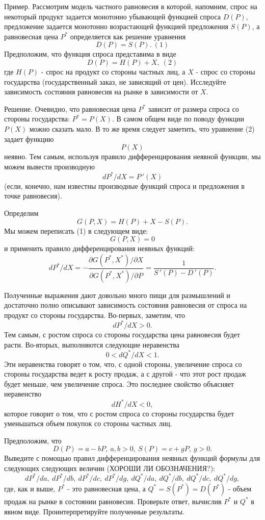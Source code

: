     Пример. Рассмотрим модель частного равновесия в которой,
    напомним, спрос на некоторый продукт задается монотонно
    убывающей функцией спроса $D(P)$, предложение задается монотонно
    возрастающей функцией предложения $S(P)$, а равновесная цена
    $P^{*}$  определяется как решение уравнения
    \[D(P)=S(P). \ (1)\]
    Предположим, что функция спроса представима в виде
    \[D(P)=H(P)+X, \   (2)\]
    где $H(P)$ - спрос на продукт со стороны частных лиц, а $X$ - спрос со
    стороны государства (государственный заказ, не зависящий от цен).
    Исследуйте зависимость состояния равновесия на рынке в зависимости
    от $X$.

    Решение. Очевидно, что равновесная цена $P^{*}$ зависит от размера
     спроса со стороны государства:
    $P^{*}=P(X).$ В самом общем виде по поводу функции $P(X)$ можно сказать мало. В то
    же время следует заметить, что уравнение (2) задает функцию
    \[P(X)\] неявно. Тем самым, используя правило дифференцирования неявной
    функции, мы можем вывести производную
    \[dP^{*}/dX=P\,'(X)\]
     (если, конечно, нам известны производные функций спроса и предложения в
    точке равновесия).


    Определим
    \[G(P,X)=H(P)+X-S(P).\]
    Мы можем переписать (1) в следующем виде:
    \[G(P,X)=0\]
    и применить правило дифференцирования неявных функций:
    \[dP^{*}/dX=
    -\frac{\partial G(P^{*},X^{*})/\partial X}{\partial G(P^{*},X^{*})/\partial P}
    =\frac{1}{S\,'(P)-D\,'(P)}.\]

    Полученные выражения дают довольно много пищи для размышлений и
    достаточно полно описывают зависимость состояния равновесия
    от спроса на продукт со стороны государства. Во-первых, заметим, что
    \[dP^{*}/dX>0.\]
    Тем самым, с ростом спроса со стороны государства цена равновесия
    будет расти. Во-вторых, выполняются следующие неравенства
    \[0<dQ^{*}/dX<1.\]
    Эти неравенства говорят о том, что, с одной стороны, увеличение
    спроса со стороны государства ведет к росту продаж, а с другой - что
    этот рост продаж будет меньше, чем увеличение спроса. Это последнее
    свойство объясняет неравенство
    \[dH^{*}/dX<0,\]
    которое говорит о том, что с ростом спроса со стороны государства
    будет уменьшаться объем покупок со стороны частных лиц.

\begin{exer}
    Предположим, что
    \[D(P)=a-bP, \ a,b>0, \ S(P)=c+gP, \ g>0.\]
    Выведите с помощью правил дифференцирования неявных функций формулы
    для следующих следующих величин (ХОРОШИ ЛИ ОБОЗНАЧЕНИЯ?):
    \[dP^{*}/da, \ dP^{*}/db, \ dP^{*}/dc, \ dP^{*}/dg, \
    dQ^{*}/da,  \ dQ^{*}/db,  \ dQ^{*}/dc, \ dQ^{*}/dg,\]
    где, как и выше, $P^{*}$ - это равновесная цена, а $Q^{*}=S(P^{*})=D(P^{*})$
    - объем продаж на рынке в состоянии равновесия. Проверьте ответ,
    вычислив $P^{*}$ и $Q^{*}$ в явном виде. Проинтерпретируйте полученные результаты.
\end{exer}


